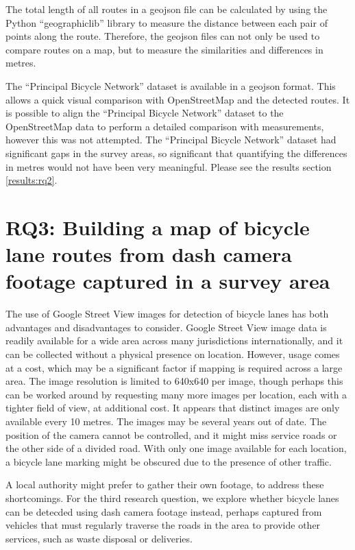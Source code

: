 \documentclass[11pt,twoside]{report}
\begin{document}
The total length of all routes in a geojson file can be calculated by using the Python ``geographiclib'' library to measure the distance between each pair of points along the route.  Therefore, the geojson files can not only be used to compare routes on a map, but to measure the similarities and differences in metres.

The ``Principal Bicycle Network'' dataset is available in a geojson format.  This allows a quick visual comparison with OpenStreetMap and the detected routes.  It is possible to align the ``Principal Bicycle Network'' dataset to the OpenStreetMap data to perform a detailed comparison with measurements, however this was not attempted.  The ``Principal Bicycle Network'' dataset had significant gaps in the survey areas, so significant that quantifying the differences in metres would not have been very meaningful.  Please see the results section \ref{results:rq2}.



\section{RQ3: Building a map of bicycle lane routes from dash camera footage captured in a survey area}
\label{s:rq3}

The use of Google Street View images for detection of bicycle lanes has both advantages and disadvantages to consider.  Google Street View image data is readily available for a wide area across many jurisdictions internationally, and it can be collected without a physical presence on location.  However, usage comes at a cost, which may be a significant factor if mapping is required across a large area.  The image resolution is limited to 640x640 per image, though perhaps this can be worked around by requesting many more images per location, each with a tighter field of view, at additional cost.  It appears that distinct images are only available every 10 metres.  The images may be several years out of date.  The position of the camera cannot be controlled, and it might miss service roads or the other side of a divided road.  With only one image available for each location, a bicycle lane marking might be obscured due to the presence of other traffic.

A local authority might prefer to gather their own footage, to address these shortcomings.  For the third research question, we explore whether bicycle lanes can be detecded using dash camera footage instead, perhaps captured from vehicles that must regularly traverse the roads in the area to provide other services, such as waste disposal or deliveries.
\end{document}
